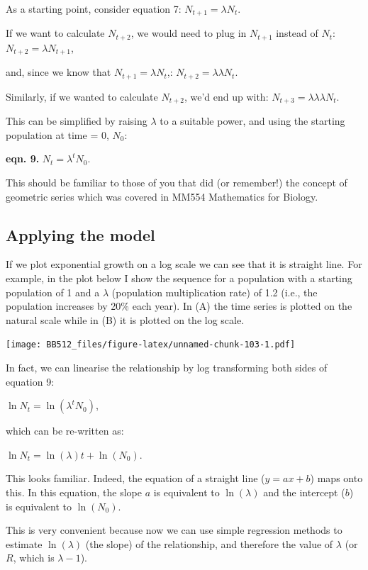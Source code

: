 \documentclass[
  a4paper]{book}
\begin{document}
As a starting point, consider equation 7: \(N_{t+1} = \lambda N_t\).

If we want to calculate \(N_{t+2}\), we would need to plug in \(N_{t+1}\) instead of \(N_t\): \(N_{t+2} = \lambda N_{t+1}\),

and, since we know that \(N_{t+1} = \lambda N_t\),: \(N_{t+2} = \lambda \lambda N_t\).

Similarly, if we wanted to calculate \(N_{t+2}\), we'd end up with: \(N_{t+3} = \lambda \lambda \lambda N_t\).

This can be simplified by raising \(\lambda\) to a suitable power, and using the starting population at time = 0, \(N_0\):

\textbf{eqn. 9.} \(N_{t} = \lambda ^tN_0\).

This should be familiar to those of you that did (or remember!) the concept of geometric series which was covered in MM554 Mathematics for Biology.

\hypertarget{applying-the-model}{%
\subsection{Applying the model}\label{applying-the-model}}

If we plot exponential growth on a log scale we can see that it is straight line. For example, in the plot below I show the sequence for a population with a starting population of 1 and a \(\lambda\) (population multiplication rate) of 1.2 (i.e., the population increases by 20\% each year). In (A) the time series is plotted on the natural scale while in (B) it is plotted on the log scale.

\texttt{[image: BB512\_files/figure-latex/unnamed-chunk-103-1.pdf]}

In fact, we can linearise the relationship by log transforming both sides of equation 9:

\(\ln{N_t} = \ln(\lambda ^tN_0)\),

which can be re-written as:

\(\ln{N_t} = \ln(\lambda )t + \ln(N_0)\).

This looks familiar. Indeed, the equation of a straight line (\(y = ax + b\)) maps onto this. In this equation, the slope \(a\) is equivalent to \(\ln(\lambda )\) and the intercept (\(b\)) is equivalent to \(\ln(N_0)\).

This is very convenient because now we can use simple regression methods to estimate \(\ln(\lambda)\) (the slope) of the relationship, and therefore the value of \(\lambda\) (or \(R\), which is \(\lambda -1\)).
\end{document}
